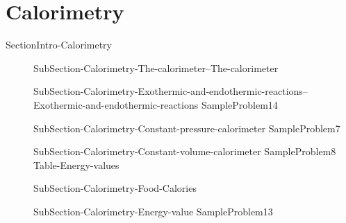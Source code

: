 \documentclass[main.tex]{subfiles}
\newcommand\chapterlabel{Ch-thermochemistry}\setcounter{figurenewcounter}{0}\setcounter{tablenewcounter}{0}\setcounter{formulanewcounter}{0}
\begin{document}
\section{Calorimetry}
{SectionIntro-Calorimetry}
\sloppy\begin{description}
\item[] 
  {SubSection-Calorimetry-The-calorimeter--The-calorimeter}
\item[]  {SubSection-Calorimetry-Exothermic-and-endothermic-reactions--Exothermic-and-endothermic-reactions}
  {SampleProblem14}
\item[] {SubSection-Calorimetry-Constant-pressure-calorimeter}
   {SampleProblem7}
\item[]  {SubSection-Calorimetry-Constant-volume-calorimeter}
   {SampleProblem8}
\hspace{-2cm}{Figure-Calorimeter}
 {Table-Energy-values}

\item[]  {SubSection-Calorimetry-Food-Calories}
\item[]  {SubSection-Calorimetry-Energy-value}
 {SampleProblem13}

\end{description}
     
     
     
\end{document}
